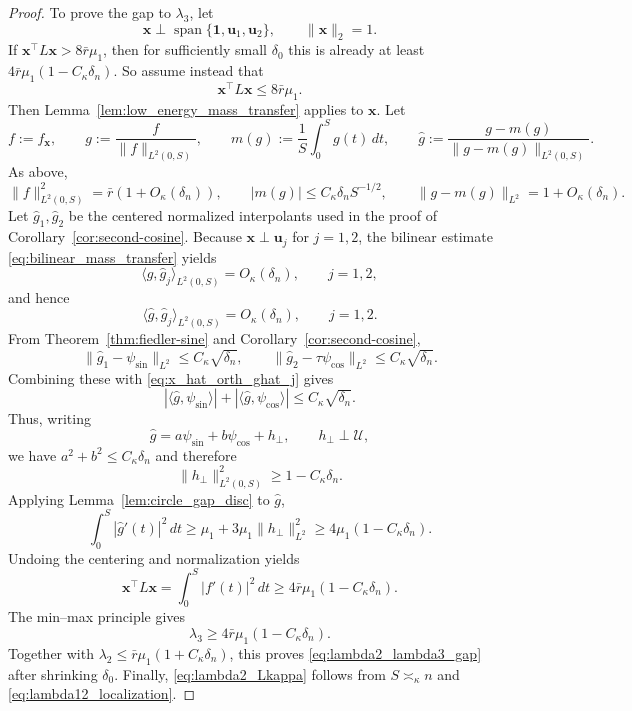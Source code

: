 \documentclass[11pt]{article}
\numberwithin{equation}{section}
\theoremstyle{definition}
\theoremstyle{remark}
\begin{document}
\begin{proof}
	To prove the gap to $\lambda_3$, let
	\[
	\boldsymbol{x}\perp \operatorname{span}\{\boldsymbol{1},\boldsymbol{u}_1,\boldsymbol{u}_2\},
	\qquad
	\|\boldsymbol{x}\|_2=1.
	\]
	If $\boldsymbol{x}^\top L\boldsymbol{x}>8\bar r\mu_1$, then for
	sufficiently small $\delta_0$ this is already at least
	$4\bar r\mu_1(1-C_\kappa\delta_n)$. So assume instead that
	\[
	\boldsymbol{x}^\top L\boldsymbol{x}\le 8\bar r\mu_1.
	\]
	Then Lemma~\ref{lem:low_energy_mass_transfer} applies to
	$\boldsymbol{x}$. Let
	\[
	f:=f_{\boldsymbol{x}},
	\qquad
	g:=\frac{f}{\|f\|_{L^2(0,S)}},
	\qquad
	m(g):=\frac1S\int_0^S g(t)\,dt,
	\qquad
	\widehat g:=\frac{g-m(g)}{\|g-m(g)\|_{L^2(0,S)}}.
	\]
	As above,
	\[
	\|f\|_{L^2(0,S)}^2=\bar r(1+O_\kappa(\delta_n)),
	\qquad
	|m(g)|\le C_\kappa\delta_n S^{-1/2},
	\qquad
	\|g-m(g)\|_{L^2}=1+O_\kappa(\delta_n).
	\]
	Let $\widehat g_1,\widehat g_2$ be the centered normalized interpolants
	used in the proof of Corollary~\ref{cor:second-cosine}. Because
	$\boldsymbol{x}\perp \boldsymbol{u}_j$ for $j=1,2$, the bilinear
	estimate \eqref{eq:bilinear_mass_transfer} yields
	\[
	\langle g,\widehat g_j\rangle_{L^2(0,S)}=O_\kappa(\delta_n),
	\qquad j=1,2,
	\]
	and hence
	\begin{equation}\label{eq:x_hat_orth_ghat_j}
		\langle \widehat g,\widehat g_j\rangle_{L^2(0,S)}
		=
		O_\kappa(\delta_n),
		\qquad j=1,2.
	\end{equation}
	From Theorem~\ref{thm:fiedler-sine} and
	Corollary~\ref{cor:second-cosine},
	\[
	\|\widehat g_1-\psi_{\sin}\|_{L^2}\le C_\kappa\sqrt{\delta_n},
	\qquad
	\|\widehat g_2-\tau\psi_{\cos}\|_{L^2}\le C_\kappa\sqrt{\delta_n}.
	\]
	Combining these with \eqref{eq:x_hat_orth_ghat_j} gives
	\[
	|\langle \widehat g,\psi_{\sin}\rangle|
	+
	|\langle \widehat g,\psi_{\cos}\rangle|
	\le
	C_\kappa\sqrt{\delta_n}.
	\]
	Thus, writing
	\[
	\widehat g=a\psi_{\sin}+b\psi_{\cos}+h_\perp,
	\qquad h_\perp\perp\mathcal U,
	\]
	we have $a^2+b^2\le C_\kappa\delta_n$ and therefore
	\[
	\|h_\perp\|_{L^2(0,S)}^2\ge 1-C_\kappa\delta_n.
	\]
	Applying Lemma~\ref{lem:circle_gap_disc} to $\widehat g$,
	\[
	\int_0^S|\widehat g'(t)|^2\,dt
	\ge
	\mu_1+3\mu_1\|h_\perp\|_{L^2}^2
	\ge
	4\mu_1(1-C_\kappa\delta_n).
	\]
	Undoing the centering and normalization yields
	\[
	\boldsymbol{x}^\top L\boldsymbol{x}
	=
	\int_0^S|f'(t)|^2\,dt
	\ge
	4\bar r\mu_1(1-C_\kappa\delta_n).
	\]
	The min--max principle gives
	\[
	\lambda_3\ge 4\bar r\mu_1(1-C_\kappa\delta_n).
	\]
	Together with $\lambda_2\le \bar r\mu_1(1+C_\kappa\delta_n)$, this proves
	\eqref{eq:lambda2_lambda3_gap} after shrinking $\delta_0$. Finally,
	\eqref{eq:lambda2_Lkappa} follows from $S\asymp_\kappa n$ and
	\eqref{eq:lambda12_localization}.
\end{proof}
\end{document}
